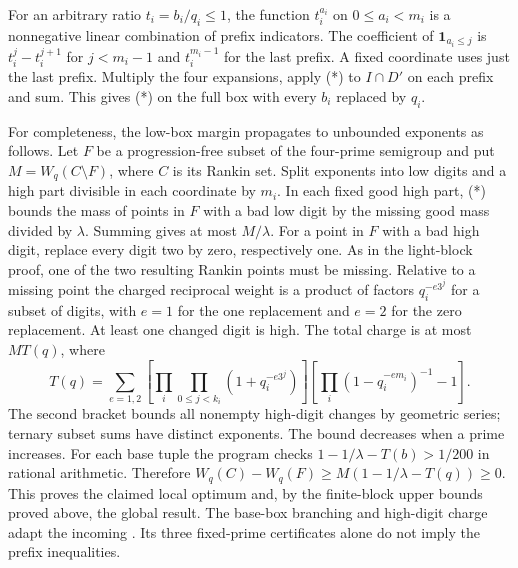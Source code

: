 For an arbitrary ratio $t_i=b_i/q_i\le1$, the function
$t_i^{a_i}$ on $0\le a_i<m_i$ is a nonnegative linear combination
of prefix indicators. The coefficient of $\mathbf1_{a_i\le j}$ is
$t_i^j-t_i^{j+1}$ for $j<m_i-1$ and $t_i^{m_i-1}$ for the last
prefix. A fixed coordinate uses just the last prefix.
Multiply the four expansions, apply (*) to $I\cap D'$ on each prefix
and sum. This gives (*) on the full box with every $b_i$ replaced by
$q_i$.

For completeness, the low-box margin propagates to unbounded exponents
as follows. Let $F$ be a progression-free subset of the four-prime
semigroup and put $M=W_q(C\setminus F)$, where $C$ is its Rankin set.
Split exponents into low digits and a high part divisible in each
coordinate by $m_i$. In each fixed good high part, (*)
bounds the mass of points in $F$ with a bad low digit by the missing
good mass divided by $\lambda$. Summing gives at most $M/\lambda$.
For a point in $F$ with a bad high digit, replace every digit two by
zero, respectively one. As in the light-block proof, one of the two
resulting Rankin points must be missing. Relative to a missing point
the charged reciprocal weight is a product of factors $q_i^{-e3^j}$
for a subset of digits, with $e=1$ for the one replacement and $e=2$
for the zero replacement. At least one changed digit is high.
The total charge is at most $M T(q)$, where
\[
 T(q)=\sum_{e=1,2}\left[\prod_i\prod_{0\le j<k_i}
       (1+q_i^{-e3^j})\right]
       \left[\prod_i(1-q_i^{-e m_i})^{-1}-1\right].
\]
The second bracket bounds all nonempty high-digit changes by geometric
series; ternary subset sums have distinct exponents. The bound decreases
when a prime increases. For each base tuple the program checks
$1-1/\lambda-T(b)>1/200$ in rational arithmetic. Therefore
$W_q(C)-W_q(F)\ge M(1-1/\lambda-T(q))\ge0$.
This proves the claimed local optimum and, by the finite-block
upper bounds proved above, the global result. The base-box
branching and high-digit charge adapt the incoming
. Its three
fixed-prime certificates alone do not imply the prefix inequalities.
